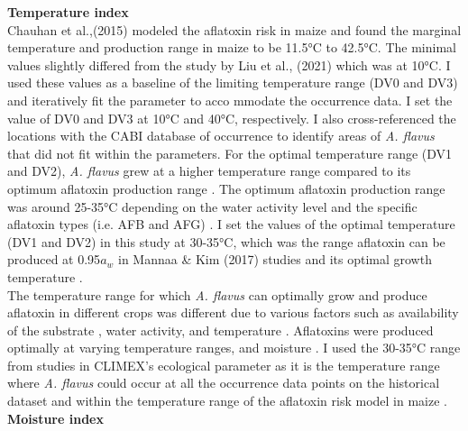 \textbf{Temperature index} \\ 
Chauhan et al.,(2015) modeled the aflatoxin risk in maize and found the marginal temperature and production range in maize to be 11.5°C to 42.5°C. The minimal values slightly differed from the study by Liu et al., (2021) which was at 10°C. I used these values as a baseline of the limiting temperature range (DV0 and DV3) and iteratively fit the parameter to acco mmodate the  occurrence data. I set the value of DV0 and DV3 at 10°C  and 40°C, respectively. I also cross-referenced the locations with the CABI database of occurrence to identify areas of \textit{A. flavus} that did not fit within the parameters. For the optimal temperature range (DV1 and DV2), \textit{A. flavus} grew at a higher temperature range compared to its optimum aflatoxin production range \citep{bernaldez2017influence}. The optimum aflatoxin production range was around 25-35°C depending on the water activity level  \citep{chauhan2015improved} \citep{mannaa2017influence} and the specific aflatoxin types (i.e. AFB and AFG) \citep{kumar2021aflatoxin}. I set the values of the optimal temperature (DV1 and DV2) in this study at 30-35°C, which was the range aflatoxin can be produced at 0.95$ a_w $ in Mannaa & Kim (2017) studies and its optimal growth temperature \citep{chuaysrinule2020comparative} \citep{norlia2020modelling}.  
\vspace{\baselineskip} \\
The temperature range for which \textit{A. flavus} can optimally grow and produce aflatoxin in different crops was different \citep{norlia2019aspergillus} due to various factors such as availability of the substrate \citep{gilbert2017carbon}, water activity, and temperature \citep{gizachew2019aflatoxin}. Aflatoxins were produced optimally at varying temperature ranges, and moisture \citep{gizachew2019aflatoxin}. I used the 30-35°C range from \citep{mannaa2017influence} studies in CLIMEX's ecological parameter as it is the temperature range where \textit{A. flavus} could occur at all the occurrence data points on the historical dataset and within the temperature range of the aflatoxin risk model in maize \citep{chauhan2015improved}.  
\vspace{\baselineskip} \\
\textbf{Moisture index} \\
